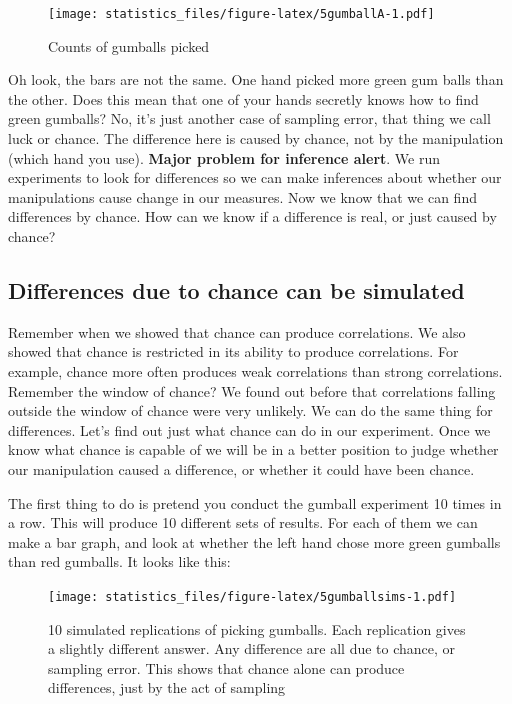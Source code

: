 \documentclass[]{book}
\begin{document}
\begin{figure}
\centering
\texttt{[image: statistics\_files/figure-latex/5gumballA-1.pdf]}
\caption{\label{fig:5gumballA}Counts of gumballs picked}
\end{figure}

Oh look, the bars are not the same. One hand picked more green gum balls than the other. Does this mean that one of your hands secretly knows how to find green gumballs? No, it's just another case of sampling error, that thing we call luck or chance. The difference here is caused by chance, not by the manipulation (which hand you use). \textbf{Major problem for inference alert}. We run experiments to look for differences so we can make inferences about whether our manipulations cause change in our measures. Now we know that we can find differences by chance. How can we know if a difference is real, or just caused by chance?

\hypertarget{differences-due-to-chance-can-be-simulated}{%
\subsection{Differences due to chance can be simulated}\label{differences-due-to-chance-can-be-simulated}}

Remember when we showed that chance can produce correlations. We also showed that chance is restricted in its ability to produce correlations. For example, chance more often produces weak correlations than strong correlations. Remember the window of chance? We found out before that correlations falling outside the window of chance were very unlikely. We can do the same thing for differences. Let's find out just what chance can do in our experiment. Once we know what chance is capable of we will be in a better position to judge whether our manipulation caused a difference, or whether it could have been chance.

The first thing to do is pretend you conduct the gumball experiment 10 times in a row. This will produce 10 different sets of results. For each of them we can make a bar graph, and look at whether the left hand chose more green gumballs than red gumballs. It looks like this:

\begin{figure}
\centering
\texttt{[image: statistics\_files/figure-latex/5gumballsims-1.pdf]}
\caption{\label{fig:5gumballsims}10 simulated replications of picking gumballs. Each replication gives a slightly different answer. Any difference are all due to chance, or sampling error. This shows that chance alone can produce differences, just by the act of sampling}
\end{figure}
\end{document}
